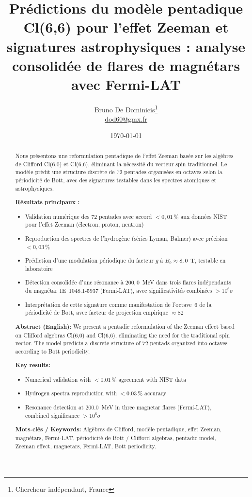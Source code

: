 \documentclass[11pt,a4paper]{article}
\title{Prédictions du modèle pentadique Cl(6,6) pour l'effet Zeeman et signatures astrophysiques : analyse consolidée de flares de magnétars avec Fermi-LAT}
\author{
  Bruno De Dominicis\thanks{Chercheur indépendant, France} \\
  \href{mailto:dod60@gmx.fr}{dod60@gmx.fr}
}
\date{\today}
\theoremstyle{plain}
\theoremstyle{definition}
\theoremstyle{remark}
\begin{document}
\maketitle

\begin{abstract}
\noindent
Nous présentons une reformulation pentadique de l'effet Zeeman basée sur les algèbres de Clifford Cl(6,0) et Cl(6,6), éliminant la nécessité du vecteur spin traditionnel. Le modèle prédit une structure discrète de 72 pentades organisées en octaves selon la périodicité de Bott, avec des signatures testables dans les spectres atomiques et astrophysiques.

\medskip
\noindent
\textbf{Résultats principaux :}
\begin{itemize}
  \item Validation numérique des 72 pentades avec accord $< 0{,}01\,\%$ aux données NIST pour l'effet Zeeman (électron, proton, neutron)
  \item Reproduction des spectres de l'hydrogène (séries Lyman, Balmer) avec précision $< 0{,}03\,\%$
  \item Prédiction d'une modulation périodique du facteur $g$ à $B_0 \approx 8{,}0$~T, testable en laboratoire
  \item Détection consolidée d'une résonance à $200{,}0$~MeV dans trois flares indépendants du magnétar 1E~1048.1‑5937 (Fermi-LAT), avec significativités combinées $> 10^6\sigma$
  \item Interprétation de cette signature comme manifestation de l'octave~6 de la périodicité de Bott, avec facteur de projection empirique $\approx 82$
\end{itemize}

\medskip
\noindent
\textbf{Abstract (English):}
We present a pentadic reformulation of the Zeeman effect based on Clifford algebras Cl(6,0) and Cl(6,6), eliminating the need for the traditional spin vector. The model predicts a discrete structure of 72 pentads organized into octaves according to Bott periodicity.

\medskip
\noindent
\textbf{Key results:}
\begin{itemize}
  \item Numerical validation with $< 0.01\,\%$ agreement with NIST data
  \item Hydrogen spectra reproduction with $< 0.03\,\%$ accuracy
  \item Resonance detection at $200.0$~MeV in three magnetar flares (Fermi-LAT), combined significance $> 10^6\sigma$
\end{itemize}

\medskip
\noindent
\textbf{Mots-clés / Keywords:} Algèbres de Clifford, modèle pentadique, effet Zeeman, magnétars, Fermi-LAT, périodicité de Bott / Clifford algebras, pentadic model, Zeeman effect, magnetars, Fermi-LAT, Bott periodicity.
\end{abstract}
\end{document}
